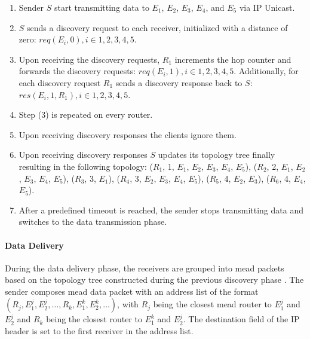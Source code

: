 \begin{enumerate}[label={(\arabic*)}]

\item
Sender $S$ start transmitting data to $E_1$, $E_2$, $E_3$, $E_4$, and $E_5$ via
    IP Unicast.

\item
$S$ sends a discovery request to each receiver, initialized with a distance of
    zero: $req(E_i, 0), i \in {1,2,3,4,5}$.

\item
Upon receiving the discovery requests, $R_1$ increments the hop counter and
    forwards the discovery requests: $req(E_i, 1), i \in {1,2,3,4,5}$.
    Additionally, for each discovery request $R_1$ sends a discovery response
        back to $S$: $res(E_i, 1, R_1), i \in {1,2,3,4,5}$.

\item
Step (3) is repeated on every router.

\item
Upon receiving discovery responses the clients ignore them.

\item
Upon receiving discovery responses $S$ updates its topology tree finally
        resulting in the following topology:
        ($R_1$, 1, $E_1$, $E_2$, $E_3$, $E_4$, $E_5$),
        ($R_2$, 2, $E_1$, $E_2$, $E_3$, $E_4$, $E_5$),
        ($R_3$, 3, $E_1$),
        ($R_4$, 3, $E_2$, $E_3$, $E_4$, $E_5$),
        ($R_5$, 4, $E_2$, $E_3$),
        ($R_6$, 4, $E_4$, $E_5$).

\item
After a predefined timeout is reached, the sender stops transmitting data and
    switches to the data transmission phase.
\end{enumerate}

\paragraph{Data Delivery} %
\label{par:Data Delivery}
During the data delivery phase, the receivers are grouped into \gls{mead}
    packets based on the topology tree constructed during the previous
    discovery phase \cite{meadcast1}.
The sender composes \gls{mead} data packet with an address list of the format
    $(R_j,E_1^j,E_2^j,\dots,R_k,E_1^k,E_2^k,\dots)$, with $R_j$ being the
    closest \gls{mead} router to $E_1^j$ and $E_2^j$ and $R_k$ being the
    closest router to $E_1^k$ and $E_2^j$.
The destination field of the IP header is set to the first receiver in the
    address list.

